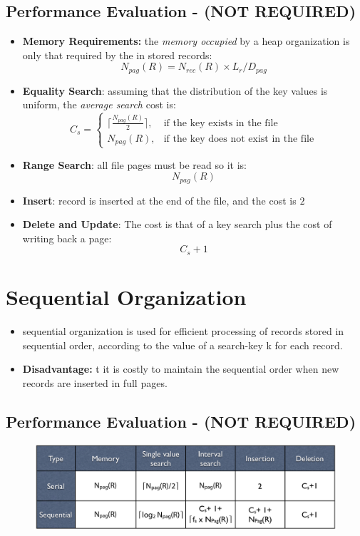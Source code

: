 \subsection{Performance Evaluation - (NOT REQUIRED)}
\begin{itemize}
    \item \textbf{Memory Requirements:} the \textit{memory occupied} by a heap organization is only that required by the in stored records:
    \[N_{pag}(R) = N_{rec}(R) \times L_r / D_{pag}\]
    \item \textbf{Equality Search}: assuming that the distribution of the key values is uniform, the \textit{average search} cost is:
    \[
    C_s = \begin{cases}  \lceil \frac{N_{pag}(R)}{2} \rceil, & \mbox{if the key exists in the file} \\ N_{pag}(R), & \mbox{if the key does not exist in the file} \end{cases}
    \]
    \item \textbf{Range Search}: all file pages must be read so it is:
    \[N_{pag}(R)\]
    \item \textbf{Insert}: record is inserted at the end of the file, and the cost is \(2\)
    \item \textbf{Delete and Update}: The cost is that of a key search plus the cost of writing back a page:
    \[C_s + 1\]
\end{itemize}

\section{Sequential Organization}
\begin{itemize}
    \item  sequential organization is used for efficient processing of records stored in sequential order, according to the value of a search-key k for each record.
    \item \textbf{Disadvantage:} t it is costly to maintain the sequential order when new records are inserted in full pages.
\end{itemize}

\subsection{Performance Evaluation - (NOT REQUIRED)}
\begin{figure}[!h]
    \centering
    \includegraphics[width=0.7\linewidth]{images/DBMS_Internals/comparison_cost_table.jpeg}
\end{figure}

